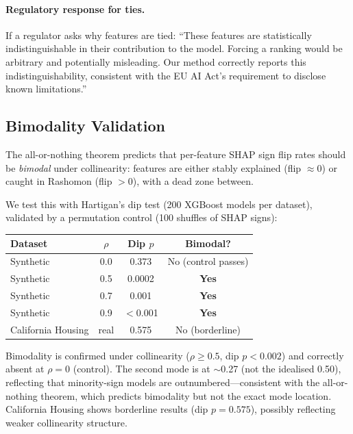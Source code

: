 \documentclass{article}
\begin{document}
\paragraph{Regulatory response for ties.}
If a regulator asks why features are tied: ``These features are statistically indistinguishable in their contribution to the model. Forcing a ranking would be arbitrary and potentially misleading. Our method correctly reports this indistinguishability, consistent with the EU AI Act's requirement to disclose known limitations.''

\subsection{Bimodality Validation}
\label{sec:bimodality-validation}

The all-or-nothing theorem predicts that per-feature SHAP sign flip rates should be \emph{bimodal} under collinearity: features are either stably explained (flip $\approx 0$) or caught in Rashomon (flip $> 0$), with a dead zone between.

We test this with Hartigan's dip test (200 XGBoost models per dataset), validated by a permutation control (100 shuffles of SHAP signs):

\begin{center}
\small
\begin{tabular}{lccc}
\toprule
Dataset & $\rho$ & Dip $p$ & Bimodal? \\
\midrule
Synthetic & 0.0 & 0.373 & No (control passes) \\
Synthetic & 0.5 & 0.0002 & \textbf{Yes} \\
Synthetic & 0.7 & 0.001 & \textbf{Yes} \\
Synthetic & 0.9 & $<$0.001 & \textbf{Yes} \\
California Housing & real & 0.575 & No (borderline) \\
\bottomrule
\end{tabular}
\end{center}

Bimodality is confirmed under collinearity ($\rho \geq 0.5$, dip $p < 0.002$) and correctly absent at $\rho = 0$ (control). The second mode is at $\sim$0.27 (not the idealised 0.50), reflecting that minority-sign models are outnumbered---consistent with the all-or-nothing theorem, which predicts bimodality but not the exact mode location. California Housing shows borderline results (dip $p = 0.575$), possibly reflecting weaker collinearity structure.
\end{document}
